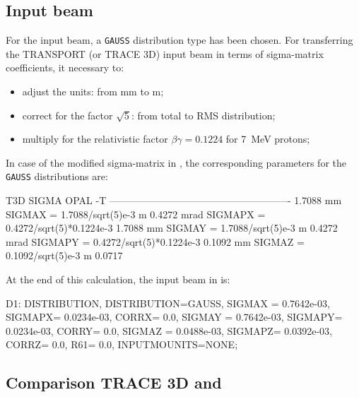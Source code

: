 \subsection{\opalt Input beam}
\label{ssec:OPAL_input}

For the input beam, a \texttt{GAUSS} distribution type has been chosen.  For transferring the TRANSPORT (or TRACE 3D) input beam in terms of sigma-matrix coefficients, it necessary to:

\begin{itemize}
\item  adjust the units: from mm to m;
\item correct for the factor $\sqrt{5}$: from total to RMS distribution;
\item multiply for the relativistic factor $\beta\gamma =\num{0.1224}$ for \SI{7}{\mega\electronvolt} protons;
\end{itemize}

 In case of the modified sigma-matrix in , the corresponding \opal parameters for the \texttt{GAUSS} distributions are:

\begin{example}
 T3D SIGMA                        OPAL -T
-------------------------------------------------------
1.7088 mm             SIGMAX  = 1.7088/sqrt(5)e-3         m
0.4272 mrad           SIGMAPX = 0.4272/sqrt(5)*0.1224e-3
1.7088 mm             SIGMAY  = 1.7088/sqrt(5)e-3        m
0.4272 mrad           SIGMAPY = 0.4272/sqrt(5)*0.1224e-3
0.1092 mm             SIGMAZ  = 0.1092/sqrt(5)e-3        m
0.0717 %
\end{example}

At the end of this calculation, the input beam in \opal is:

\begin{example}
D1: DISTRIBUTION, DISTRIBUTION=GAUSS,
SIGMAX = 0.7642e-03,  SIGMAPX= 0.0234e-03,  CORRX= 0.0,
SIGMAY = 0.7642e-03,  SIGMAPY= 0.0234e-03,  CORRY= 0.0,
SIGMAZ = 0.0488e-03,  SIGMAPZ= 0.0392e-03,  CORRZ= 0.0, R61= 0.0,
INPUTMOUNITS=NONE;
\end{example}


\subsection{Comparison TRACE 3D and \opalt}
\label{sec:T3D_OPAL}


